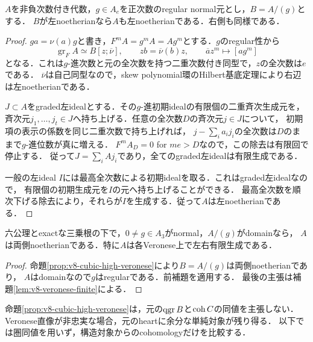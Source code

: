 \documentclass[11pt,a4paper]{ltjsarticle}
\begin{document}
\begin{lemma}[正次数normal元によるnoetherian性の持上げ]
\label{lem:v8-normal-noetherian-lift}
$A$を非負次数付き代数，$g\in A_e$を正次数のregular normal元とし，$B=A/(g)$とする．
$B$が左noetherianなら$A$も左noetherianである．右側も同様である．
\end{lemma}
\begin{proof}
$ga=\nu(a)g$と書き，$F^mA=g^mA=Ag^m$とする．$g$のregular性から
\[
 \operatorname{gr}_F A\simeq B[z;\overline\nu],\qquad
 zb=\overline\nu(b)z,\qquad \overline a z^m\longmapsto[ag^m]
\]
となる．これは$g$-進次数と元の全次数を持つ二重次数付き同型で，$z$の全次数は$e$である．
$\overline\nu$は自己同型なので，skew polynomial環のHilbert基底定理により右辺は左noetherianである．

$J\subset A$をgraded左idealとする．その$g$-進初期idealの有限個の二重斉次生成元を，
斉次元$j_1,\ldots,j_t\in J$へ持ち上げる．任意の全次数$D$の斉次元$j\in J$について，
初期項の表示の係数を同じ二重次数で持ち上げれば，
$j-\sum_i a_i j_i$の全次数は$D$のままで$g$-進位数が真に増える．
$F^mA_D=0$ for $me>D$なので，この除去は有限回で停止する．
従って$J=\sum_iAj_i$であり，全てのgraded左idealは有限生成である．

一般の左ideal $I$には最高全次数による初期idealを取る．これはgraded左idealなので，
有限個の初期生成元を$I$の元へ持ち上げることができる．
最高全次数を順次下げる除去により，それらが$I$を生成する．従って$A$は左noetherianである．
\end{proof}

\begin{corollary}[整三次normal境界を持つambientの両側noetherian性]
\label{cor:v8-cubic-ambient-noetherian}
六公理とexactな三乗根の下で，$0\ne g\in A_3$がnormal，$A/(g)$がdomainなら，
$A$は両側noetherianである．特に$A$は各Veronese上で左右有限生成である．
\end{corollary}
\begin{proof}
命題\ref{prop:v8-cubic-high-veronese}により$B=A/(g)$は両側noetherianであり，
$A$はdomainなので$g$はregularである．前補題を適用する．
最後の主張は補題\ref{lem:v8-veronese-finite}による．
\end{proof}

\begin{remark}[高Veroneseと元のheart]
命題\ref{prop:v8-cubic-high-veronese}は，元の$\operatorname{qgr} B$と$\operatorname{coh} C$の同値を主張しない．
Veronese直像が非忠実な場合，元のheartに余分な単純対象が残り得る．
以下では圏同値を用いず，構造対象からのcohomologyだけを比較する．
\end{remark}
\end{document}
